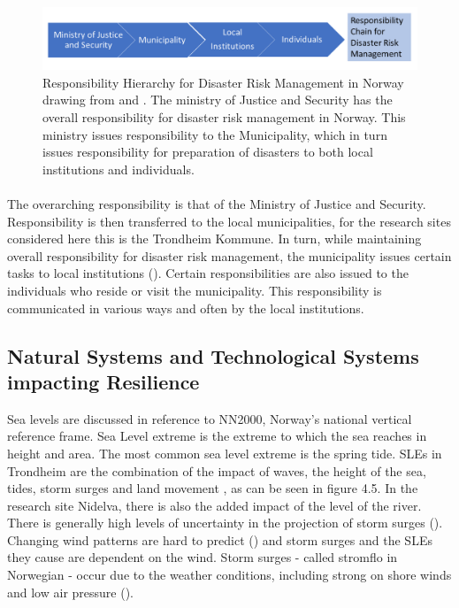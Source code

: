 \begin{figure} [h]
    \centering
    \includegraphics[width=1\textwidth]{fig_theory/responsibility drm.png}
    \caption{Responsibility Hierarchy for Disaster Risk Management in Norway drawing from \cite{rasanen_conceptualizing_2020} and \cite{hanssen_saksframlegg_2013}. The ministry of Justice and Security has the overall responsibility for disaster risk management in Norway. This ministry issues responsibility to the Municipality, which in turn issues responsibility for preparation of disasters to both local institutions and individuals. }
    \label{fig:drm_responsibility}
\end{figure}
\paragraph{}
The overarching responsibility is that of the Ministry of Justice and Security. Responsibility is then transferred to the local municipalities, for the research sites considered here this is the Trondheim Kommune. In turn, while maintaining overall responsibility for disaster risk management, the municipality issues certain tasks to local institutions (\cite{hanssen_saksframlegg_2013}). Certain responsibilities are also issued to the individuals who reside or visit the municipality. This responsibility is communicated in various ways and often by the local institutions. 





\subsection{Natural Systems and Technological Systems impacting Resilience }
Sea levels are discussed in reference to NN2000, Norway's national vertical reference frame. Sea Level extreme is the extreme to which the sea reaches in height and area. The most common sea level extreme is the spring tide. SLEs in Trondheim are the combination of the impact of waves, the height of the sea, tides, storm surges and land movement \cite{hanssen-bauer_climate_2017}, as can be seen in figure 4.5. In the research site Nidelva, there is also the added impact of the level of the river. There is generally high levels of uncertainty in the projection of storm surges (\cite{nilsen_sealevelchangefornorway_nodate}). Changing wind patterns are hard to predict (\cite{rod_three_2015}) and storm surges and the SLEs they cause are dependent on the wind. Storm surges - called stromflo in Norwegian -  occur due to the weather conditions, including strong on shore winds and low air pressure (\cite{hanssen_saksframlegg_2013}). 

